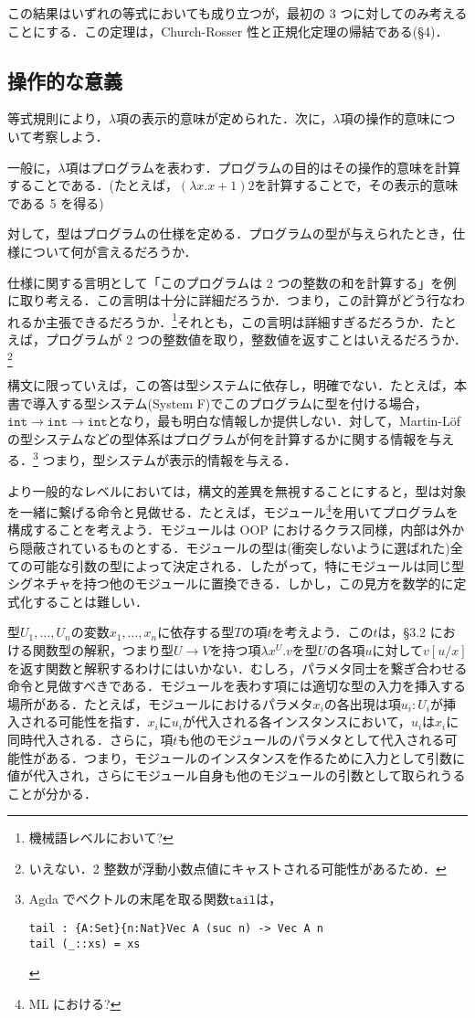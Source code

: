 \documentclass[a4paper,10pt,platex, dvipdfmx]{jsarticle}
\begin{document}
この結果はいずれの等式においても成り立つが，最初の 3 つに対してのみ考えることにする．この定理は，Church-Rosser 性と正規化定理の帰結である(\S4)．
\subsection{操作的な意義}
等式規則により，$\lambda$項の表示的意味が定められた．次に，$\lambda$項の操作的意味について考察しよう．

一般に，$\lambda$項はプログラムを表わす．プログラムの目的はその操作的意味を計算することである．(たとえば，$(\lambda x. x + 1) 2$を計算することで，その表示的意味である 5 を得る)

対して，型はプログラムの仕様を定める．プログラムの型が与えられたとき，仕様について何が言えるだろうか．

仕様に関する言明として「このプログラムは 2 つの整数の和を計算する」を例に取り考える．この言明は十分に詳細だろうか．つまり，この計算がどう行なわれるか主張できるだろうか．\footnote{機械語レベルにおいて?}それとも，この言明は詳細すぎるだろうか．たとえば，プログラムが 2 つの整数値を取り，整数値を返すことはいえるだろうか．\footnote{いえない．2 整数が浮動小数点値にキャストされる可能性があるため．}

構文に限っていえば，この答は型システムに依存し，明確でない．たとえば，本書で導入する型システム(System F)でこのプログラムに型を付ける場合，$\mathtt{int\rightarrow int \rightarrow int}$となり，最も明白な情報しか提供しない．対して，Martin-L\"of の型システムなどの型体系はプログラムが何を計算するかに関する情報を与える．\footnote{Agda でベクトルの末尾を取る関数$\mathtt{tail}$は，\begin{lstlisting}
tail : {A:Set}{n:Nat}Vec A (suc n) -> Vec A n
tail (_::xs) = xs
\end{lstlisting}}
つまり，型システムが表示的情報を与える．

より一般的なレベルにおいては，構文的差異を無視することにすると，型は対象を一緒に繋げる命令と見做せる．たとえば，モジュール\footnote{ML における?}を用いてプログラムを構成することを考えよう．モジュールは OOP におけるクラス同様，内部は外から隠蔽されているものとする．モジュールの型は(衝突しないように選ばれた)全ての可能な引数の型によって決定される．したがって，特にモジュールは同じ型シグネチャを持つ他のモジュールに置換できる．しかし，この見方を数学的に定式化することは難しい．

型$U_{1},\ldots,U_{n}$の変数$x_{1},\ldots, x_{n}$に依存する型$T$の項$t$を考えよう．この$t$は，\S3.2 における関数型の解釈，つまり型$U\rightarrow V$を持つ項$\lambda x^{U}. v$を型$U$の各項$u$に対して$v\left[u/x\right]$を返す関数と解釈するわけにはいかない．むしろ，パラメタ同士を繋ぎ合わせる命令と見做すべきである．モジュールを表わす項には適切な型の入力を挿入する場所がある．たとえば，モジュールにおけるパラメタ$x_{i}$の各出現は項$u_{i}:U_{i}$が挿入される可能性を指す．$x_{i}$に$u_{i}$が代入される各インスタンスにおいて，$u_{i}$は$x_{i}$に同時代入される．さらに，項$t$も他のモジュールのパラメタとして代入される可能性がある．つまり，モジュールのインスタンスを作るために入力として引数に値が代入され，さらにモジュール自身も他のモジュールの引数として取られうることが分かる．
\end{document}
